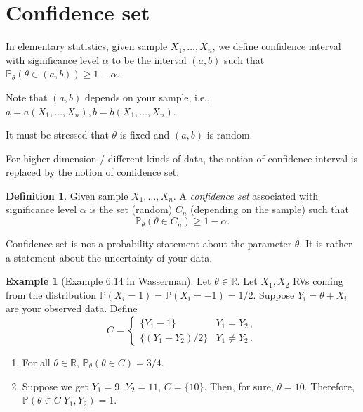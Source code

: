 \documentclass[
  openany]{book}
\theoremstyle{definition}
\newtheorem{definition}{Definition}[chapter]
\theoremstyle{definition}
\newtheorem{example}{Example}[chapter]
\theoremstyle{definition}
\theoremstyle{definition}
\theoremstyle{remark}
\begin{document}
\hypertarget{confidence-set}{%
\section{Confidence set}\label{confidence-set}}

In elementary statistics,
given sample \(X_1, \dots, X_n\),
we define confidence interval with significance level \(\alpha\)
to be the interval \((a,b)\) such that \(\mathbb{P}_\theta( \theta \in (a,b) ) \geq 1 - \alpha\).

Note that \((a,b)\) depends on your sample, i.e.,
\(a = a(X_1, \dots, X_n), b = b(X_1, \dots, X_n)\).

It must be stressed that \(\theta\) is fixed and \((a,b)\) is random.

For higher dimension / different kinds of data, the notion of confidence interval
is replaced by the notion of confidence set.

\begin{definition}
Given sample \(X_1, \dots, X_n\).
A \emph{confidence set} associated with significance level \(\alpha\) is the set (random) \(C_n\) (depending on the sample)
such that
\[ \mathbb{P}_\theta(\theta \in C_n) \geq 1 - \alpha. \]
\end{definition}

Confidence set is not a probability statement about the parameter \(\theta\). It is
rather a statement about the uncertainty of your data.

\begin{example}[Example 6.14 in Wasserman]

Let \(\theta \in \mathbb{R}\). Let \(X_1, X_2\) RVs coming from the distribution
\(\mathbb{P}(X_i = 1) = \mathbb{P}(X_i = -1) = 1/2\).
Suppose \(Y_i = \theta + X_i\) are your observed data.
Define
\[ C = \begin{cases}
    \{ Y_1 - 1\} & Y_1 = Y_2 \,, \\
    \{ (Y_1 + Y_2)/2 \} & Y_1 \not= Y_2 \,.
\end{cases}\]

\begin{enumerate}
\def\labelenumi{\arabic{enumi}.}
\item
  For all \(\theta\in \mathbb{R}\), \(\mathbb{P}_\theta(\theta \in C ) = 3/4\).
\item
  Suppose we get \(Y_1 = 9\), \(Y_2 = 11\), \(C = \{ 10 \}\). Then, for sure, \(\theta = 10\).
  Therefore,
  \(\mathbb{P}(\theta \in C | Y_1, Y_2) = 1\).
\end{enumerate}

\end{example}
\end{document}

